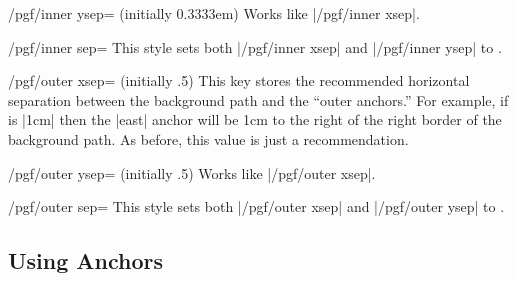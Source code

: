 \begin{key}{/pgf/inner ysep= (initially 0.3333em)}
  Works like |/pgf/inner xsep|.
\end{key}

\begin{key}{/pgf/inner sep=}
  This style sets both |/pgf/inner xsep| and |/pgf/inner ysep| to .
\end{key}



\begin{key}{/pgf/outer xsep= (initially .5\string\pgflinewidth)}
  This key stores the recommended horizontal separation between the
  background path and the ``outer anchors.'' For example, if
   is |1cm| then the |east| anchor will be 1cm to the
  right of the right border of the background path. 
  As before, this value is just a recommendation.
  
\begin{codeexample}[]
\end{codeexample}
\end{key}

\begin{key}{/pgf/outer ysep= (initially .5\string\pgflinewidth)}
  Works like |/pgf/outer xsep|.
\end{key}

\begin{key}{/pgf/outer sep=}
  This style sets both |/pgf/outer xsep| and |/pgf/outer ysep| to .
\end{key}



\subsection{Using Anchors}

